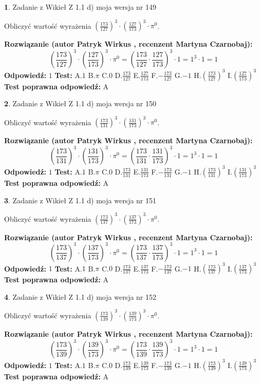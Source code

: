 \documentclass[12pt, a4paper]{article}
\theoremstyle{definition} %
\newtheorem{zad}{}
\newcommand{\zadStart}[1]{\begin{zad}#1\newline}
\newcommand{\zadStop}{\end{zad}}
\newcommand{\rozwStart}[2]{\noindent \textbf{Rozwiązanie (autor #1 , recenzent #2): }\newline}
\newcommand{\rozwStop}{\newline}
\newcommand{\odpStart}{\noindent \textbf{Odpowiedź:}\newline}
\newcommand{\odpStop}{\newline}
\newcommand{\testStart}{\noindent \textbf{Test:}\newline}
\newcommand{\testStop}{\newline}
\newcommand{\kluczStart}{\noindent \textbf{Test poprawna odpowiedź:}\newline}
\newcommand{\kluczStop}{\newline}
\begin{document}
\zadStart{Zadanie z Wikieł Z 1.1 d) moja wersja nr 149}

Obliczyć wartość wyrażenia $(\frac{173}{127})^{3} \cdot (\frac{127}{173})^{3} \cdot \pi^{0}$.
\zadStop
\rozwStart{Patryk Wirkus}{Martyna Czarnobaj}
$$(\frac{173}{127})^{3} \cdot (\frac{127}{173})^{3} \cdot \pi^{0} = (\frac{173}{127} \cdot \frac{127}{173})^{3} \cdot 1 = 1^{3} \cdot 1 = 1$$
\rozwStop
\odpStart
$1$
\odpStop
\testStart
A.$1$ B.$\pi$ C.$0$ D.$\frac{173}{127}$ E.$\frac{127}{173}$
F.$-\frac{173}{127}$ G.$-1$
H.$(\frac{173}{127})^{3}$
I.$(\frac{127}{173})^{3}$
\testStop
\kluczStart
A
\kluczStop



\zadStart{Zadanie z Wikieł Z 1.1 d) moja wersja nr 150}

Obliczyć wartość wyrażenia $(\frac{173}{131})^{3} \cdot (\frac{131}{173})^{3} \cdot \pi^{0}$.
\zadStop
\rozwStart{Patryk Wirkus}{Martyna Czarnobaj}
$$(\frac{173}{131})^{3} \cdot (\frac{131}{173})^{3} \cdot \pi^{0} = (\frac{173}{131} \cdot \frac{131}{173})^{3} \cdot 1 = 1^{3} \cdot 1 = 1$$
\rozwStop
\odpStart
$1$
\odpStop
\testStart
A.$1$ B.$\pi$ C.$0$ D.$\frac{173}{131}$ E.$\frac{131}{173}$
F.$-\frac{173}{131}$ G.$-1$
H.$(\frac{173}{131})^{3}$
I.$(\frac{131}{173})^{3}$
\testStop
\kluczStart
A
\kluczStop



\zadStart{Zadanie z Wikieł Z 1.1 d) moja wersja nr 151}

Obliczyć wartość wyrażenia $(\frac{173}{137})^{3} \cdot (\frac{137}{173})^{3} \cdot \pi^{0}$.
\zadStop
\rozwStart{Patryk Wirkus}{Martyna Czarnobaj}
$$(\frac{173}{137})^{3} \cdot (\frac{137}{173})^{3} \cdot \pi^{0} = (\frac{173}{137} \cdot \frac{137}{173})^{3} \cdot 1 = 1^{3} \cdot 1 = 1$$
\rozwStop
\odpStart
$1$
\odpStop
\testStart
A.$1$ B.$\pi$ C.$0$ D.$\frac{173}{137}$ E.$\frac{137}{173}$
F.$-\frac{173}{137}$ G.$-1$
H.$(\frac{173}{137})^{3}$
I.$(\frac{137}{173})^{3}$
\testStop
\kluczStart
A
\kluczStop



\zadStart{Zadanie z Wikieł Z 1.1 d) moja wersja nr 152}

Obliczyć wartość wyrażenia $(\frac{173}{139})^{3} \cdot (\frac{139}{173})^{3} \cdot \pi^{0}$.
\zadStop
\rozwStart{Patryk Wirkus}{Martyna Czarnobaj}
$$(\frac{173}{139})^{3} \cdot (\frac{139}{173})^{3} \cdot \pi^{0} = (\frac{173}{139} \cdot \frac{139}{173})^{3} \cdot 1 = 1^{3} \cdot 1 = 1$$
\rozwStop
\odpStart
$1$
\odpStop
\testStart
A.$1$ B.$\pi$ C.$0$ D.$\frac{173}{139}$ E.$\frac{139}{173}$
F.$-\frac{173}{139}$ G.$-1$
H.$(\frac{173}{139})^{3}$
I.$(\frac{139}{173})^{3}$
\testStop
\kluczStart
A
\kluczStop
\end{document}
